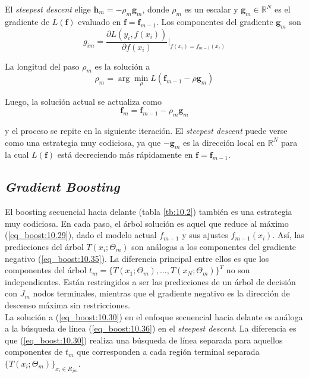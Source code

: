 El \textit{steepest descent} elige $\mathbf{h}_m = -\rho_m \mathbf{g}_m$, donde $\rho_m$ es un escalar y $\mathbf{g}_m \in \mathbb{R}^N$ es el gradiente de $L(\mathbf{f})$ evaluado en $\mathbf{f} = \mathbf{f}_{m-1}$. Los componentes del gradiente $\mathbf{g}_m$ son
\begin{equation}
g_{im} = \frac{\partial L(y_i, f(x_i))}{\partial f(x_i)} \bigg|_{f(x_i) = f_{m-1}(x_i)}
\label{eq_boost:10.35}
\end{equation}

\noindent La longitud del paso $\rho_m$ es la solución a
\begin{equation}
\rho_m = \arg\min_{\rho} L(\mathbf{f}_{m-1} - \rho \mathbf{g}_m)
\label{eq_boost:10.36}
\end{equation}

\noindent Luego, la solución actual se actualiza como
\begin{equation}
\mathbf{f}_m = \mathbf{f}_{m-1} - \rho_m \mathbf{g}_m
\end{equation}

\noindent y el proceso se repite en la siguiente iteración. El \textit{steepest descent} puede verse como una estrategia muy codiciosa, ya que $-\mathbf{g}_m$ es la dirección local en $\mathbb{R}^N$ para la cual $L(\mathbf{f})$ está decreciendo más rápidamente en $\mathbf{f} = \mathbf{f}_{m-1}$.

\subsection{\textit{Gradient Boosting}}

El boosting secuencial hacia delante (tabla \ref{tb:10.2}) también es una estrategia muy codiciosa. En cada paso, el árbol solución es aquel que reduce al máximo (\ref{eq_boost:10.29}), dado el modelo actual $f_{m-1}$ y sus ajustes $f_{m-1}(x_i)$. Así, las predicciones del árbol $T(x_i; \Theta_m)$ son análogas a los componentes del gradiente negativo (\ref{eq_boost:10.35}). La diferencia principal entre ellos es que los componentes del árbol $t_m = \{ T(x_1; \Theta_m), \dots, T(x_N; \Theta_m) \}^T$ no son independientes. Están restringidos a ser las predicciones de un árbol de decisión con $J_m$ nodos terminales, mientras que el gradiente negativo es la dirección de descenso máxima sin restricciones. \\

La solución a (\ref{eq_boost:10.30}) en el enfoque secuencial hacia delante es análoga a la búsqueda de línea (\ref{eq_boost:10.36}) en el \textit{steepest descent}. La diferencia es que (\ref{eq_boost:10.30}) realiza una búsqueda de línea separada para aquellos componentes de $t_m$ que corresponden a cada región terminal separada $\{ T(x_i; \Theta_m) \}_{x_i \in R_{jm}}$. \\

